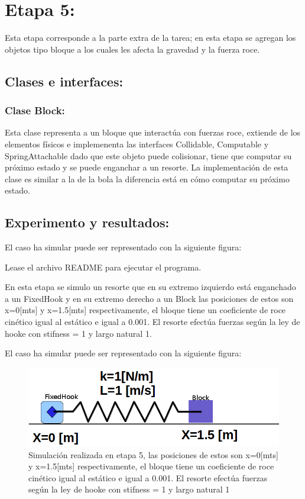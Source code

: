 \documentclass[a4paper,10pt]{article}
\begin{document}
\section{Etapa 5:}


Esta etapa corresponde a la parte extra de la tarea; en esta etapa se agregan los objetos tipo bloque a los cuales les afecta la gravedad 
y la fuerza roce.\newline

 
\subsection{Clases e interfaces:}
\subsubsection{Clase Block:}
Esta clase representa a un bloque que interactúa con fuerzas roce, extiende de los elementos físicos e implemenenta las interfaces
Collidable, Computable y SpringAttachable dado que este objeto puede colisionar, tiene que computar su próximo estado y se puede 
enganchar a un resorte. La implementación de esta clase es similar a la de la bola la diferencia está en cómo computar su próximo estado.


\subsection{Experimento y resultados:}

 El caso ha simular puede ser representado con la siguiente figura:

Lease el archivo README para ejecutar el programa.\newline

En esta etapa se simulo un resorte que en su extremo izquierdo está enganchado a un FixedHook y en su extremo derecho a un Block
las posiciones de estos son x=0[mts] y x=1.5[mts] respectivamente, el bloque tiene un coeficiente de roce cinético igual al estático e igual a 0.001. El resorte efectúa fuerzas según la ley de hooke con stifness 
= 1 y largo natural 1. \newline

 El caso ha simular puede ser representado con la siguiente figura:
  
   \begin{figure}[H]
 \centering
 \includegraphics[scale=0.3]{./FigureD.png}
 \caption{Simulación realizada en etapa 5, las posiciones de estos son x=0[mts] y x=1.5[mts] respectivamente,
 el bloque tiene un coeficiente de roce cinético igual al estático e igual a 0.001. El resorte efectúa fuerzas
 según la ley de hooke con stifness 
= 1 y largo natural 1}
  \label{etapa5.1}
\end{figure}
\end{document}
